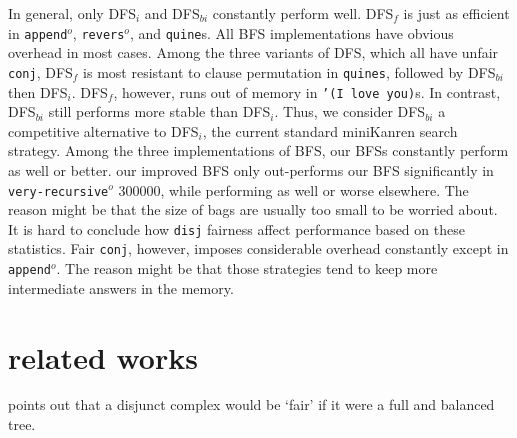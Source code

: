 \documentclass[format=acmlarge, review=true, authordraft=true]{acmart}
\newcommand{\conj}{\texttt{conj}}
\newcommand{\disj}{\texttt{disj}}
\newcommand{\veryrecursiveo}{\texttt{very-recursive$^o$}}
\newcommand{\appendo}{\texttt{append$^o$}}
\newcommand{\reverso}{\texttt{revers$^o$}}
\newcommand{\DFSi }[0]{DFS$_{i}$}
\newcommand{\DFSf }[0]{DFS$_{f}$}
\newcommand{\DFSbi}[0]{DFS$_{bi}$}
\newcommand{\BFS}[0]{BFS}
\newcommand{\BFSuni}[0]{our BFS}
\newcommand{\BFSimp}[0]{our improved BFS}
\begin{document}



In general, only \DFSi{} and \DFSbi{} constantly perform well. \DFSf{}
is just as efficient in \appendo, \reverso, and \texttt{quine}s. All BFS
implementations have obvious overhead in most cases. 
Among the three variants of DFS, which all have unfair \conj{}, \DFSf{} is most 
resistant to clause permutation in \texttt{quines}, followed by \DFSbi{} then 
\DFSi{}. \DFSf{}, however, runs out of memory in \texttt{'(I love you)}s. In 
contrast, \DFSbi{} still performs more stable than \DFSi{}. Thus, we consider 
\DFSbi{} a competitive alternative to \DFSi{}, the current standard miniKanren 
search strategy. 
Among the three implementations of \BFS, our \BFS{}s constantly perform as well 
or better. \BFSimp{} only out-performs \BFSuni{} significantly in 
\veryrecursiveo{} 300000, while performing as well or worse elsewhere. The 
reason might be that the size of bags are usually too small to be worried about.
It is hard to conclude how \disj{} fairness affect performance based on these 
statistics. Fair \conj{}, however, imposes considerable overhead constantly 
except in \appendo. The reason might be that those strategies tend to keep more 
intermediate answers in the memory.

\section{related works}

\citet{yang2010adventures} points out that a disjunct complex would be `fair' 
if it were a full and balanced tree.
\end{document}
